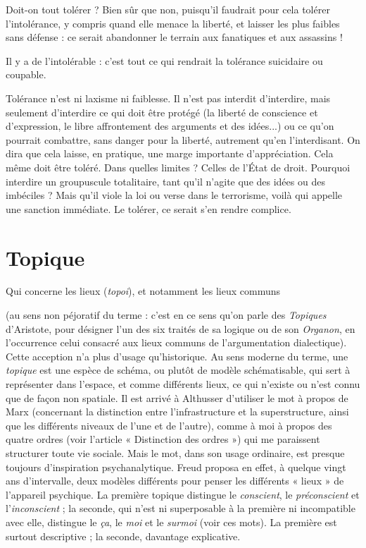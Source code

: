 Doit-on tout tolérer ? Bien sûr que non, puisqu'il faudrait pour cela tolérer
l'intolérance, y compris quand elle menace la liberté, et laisser les plus faibles
sans défense : ce serait abandonner le terrain aux fanatiques et aux assassins !

Il y a de l’intolérable : c’est tout ce qui rendrait la tolérance suicidaire ou
coupable.

Tolérance n’est ni laxisme ni faiblesse. Il n’est pas interdit d’interdire, mais
seulement d'interdire ce qui doit être protégé (la liberté de conscience et
d'expression, le libre affrontement des arguments et des idées...) ou ce qu'on
pourrait combattre, sans danger pour la liberté, autrement qu’en l’interdisant.
On dira que cela laisse, en pratique, une marge importante d’appréciation. Cela
même doit être toléré. Dans quelles limites ? Celles de l’État de droit. Pourquoi
interdire un groupuscule totalitaire, tant qu’il n’agite que des idées ou des
imbéciles ? Mais qu’il viole la loi ou verse dans le terrorisme, voilà qui appelle
une sanction immédiate. Le tolérer, ce serait s’en rendre complice.

\section{Topique}
Qui concerne les lieux ({\it topoi}), et notamment les lieux communs

(au sens non péjoratif du terme : c’est en ce sens qu’on parle des
{\it Topiques} d’Aristote, pour désigner l’un des six traités de sa logique ou de son
{\it Organon}, en l'occurrence celui consacré aux lieux communs de l’argumentation
dialectique). Cette acception n’a plus d’usage qu’historique. Au sens moderne
du terme, une {\it topique} est une espèce de schéma, ou plutôt de modèle schématisable,
qui sert à représenter dans l’espace, et comme différents lieux, ce qui
n'existe ou n’est connu que de façon non spatiale. Il est arrivé à Althusser d’utiliser
le mot à propos de Marx (concernant la distinction entre l’infrastructure
et la superstructure, ainsi que les différents niveaux de l’une et de l’autre),
comme à moi à propos des quatre ordres (voir l’article « Distinction des
ordres ») qui me paraissent structurer toute vie sociale. Mais le mot, dans son
usage ordinaire, est presque toujours d'inspiration psychanalytique. Freud proposa
en effet, à quelque vingt ans d’intervalle, deux modèles différents pour
penser les différents « lieux » de l'appareil psychique. La première topique distingue
le {\it conscient}, le {\it préconscient} et l'{\it inconscient} ; la seconde, qui n’est ni superposable
à la première ni incompatible avec elle, distingue le {\it ça}, le {\it moi} et le
{\it surmoi} (voir ces mots). La première est surtout descriptive ; la seconde, davantage
explicative.


